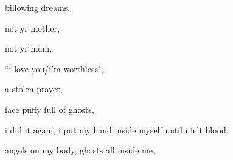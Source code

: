 \documentclass[extrafontsizes, 48pt]{memoir}
\begin{document}
	\begin{minipage}{.6\textwidth}
	billowing dreams,
	\end{minipage}
	\newpage

	\begin{minipage}{.6\textwidth}
	not yr mother,
	\end{minipage}
	\newpage

	\begin{minipage}{.6\textwidth}
	not yr mum,
	\end{minipage}
	\newpage

	\begin{minipage}{.6\textwidth}
	``i love you/i'm worthless",
	\end{minipage}
	\newpage

	\begin{minipage}{.6\textwidth}
	a stolen prayer,
	\end{minipage}
	\newpage

	\begin{minipage}{.6\textwidth}
	face puffy full of ghosts,
	\end{minipage}
	\newpage

	\begin{minipage}{.6\textwidth}
	i did it again, i put my hand inside myself until i felt blood,
	\end{minipage}
	\newpage

	\begin{minipage}{.6\textwidth}
	angels on my body, ghosts all inside me,
	\end{minipage}
	\newpage
\end{document}
